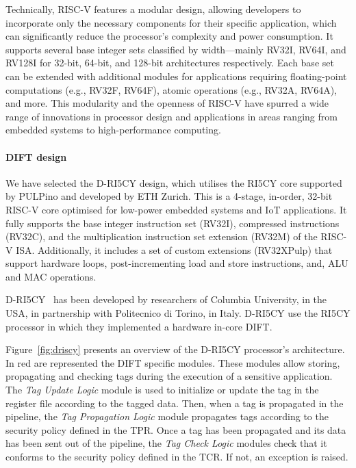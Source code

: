 Technically, RISC-V features a modular design, allowing developers to incorporate only the necessary components for their specific application, which can significantly reduce the processor's complexity and power consumption. It supports several base integer sets classified by width—mainly RV32I, RV64I, and RV128I for 32-bit, 64-bit, and 128-bit architectures respectively. Each base set can be extended with additional modules for applications requiring floating-point computations (e.g., RV32F, RV64F), atomic operations (e.g., RV32A, RV64A), and more. This modularity and the openness of RISC-V have spurred a wide range of innovations in processor design and applications in areas ranging from embedded systems to high-performance computing.

\paragraph{DIFT design} We have selected the D-RI5CY design, which utilises the RI5CY core supported by PULPino and developed by ETH Zurich. This is a 4-stage, in-order, 32-bit RISC-V core optimised for low-power embedded systems and IoT applications. It fully supports the base integer instruction set (RV32I), compressed instructions (RV32C), and the multiplication instruction set extension (RV32M) of the RISC-V ISA. Additionally, it includes a set of custom extensions (RV32XPulp) that support hardware loops, post-incrementing load and store instructions, and, ALU and MAC operations.

D-RI5CY~\cite{PDGLC-18-hpec} has been developed by researchers of Columbia University, in the USA, in partnership with Politecnico di Torino, in Italy. D-RI5CY use the RI5CY processor in which they implemented a hardware in-core DIFT.

Figure~\ref{fig:driscy} presents an overview of the D-RI5CY processor's architecture. In red are represented the DIFT specific modules.
These modules allow storing, propagating and checking tags during the execution of a sensitive application.
The \textit{Tag Update Logic} module is used to initialize or update the tag in the register file according to the tagged data.
Then, when a tag is propagated in the pipeline, the \textit{Tag Propagation Logic} module propagates tags according to the security policy defined in the TPR.
Once a tag has been propagated and its data has been sent out of the pipeline, the \textit{Tag Check Logic} modules check that it conforms to the security policy defined in the TCR. If not, an exception is raised.

